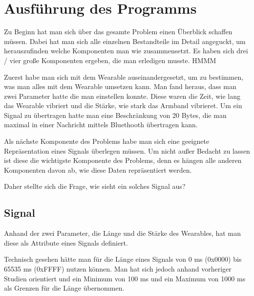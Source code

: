 
\section{Ausf{\"u}hrung des Programms}
\label{ch:Entwurf:sec:Ausf{\"u}hrung des Programms}

Zu Beginn hat man sich {\"u}ber das gesamte Problem einen {\"U}berblick schaffen m{\"u}ssen.
Dabei hat man sich alle einzelnen Bestandteile im Detail angeguckt, um herauszufinden welche Komponenten man wie zusammensetzt. 
Es haben sich drei / vier gro{\ss}e Komponenten ergeben, die man erledigen musste. HMMM 

Zuerst habe man sich mit dem Wearable auseinandergesetzt, um zu bestimmen, was man alles mit dem Wearable umsetzen kann.
Man fand heraus, dass man zwei Parameter hatte die man einstellen konnte. Diese waren die Zeit, wie lang das Wearable vibriert und die St{\"a}rke, wie stark das Armband vibrieret.
Um ein Signal zu {\"u}bertragen hatte man eine Beschr{\"a}nkung von 20 Bytes, die man maximal in einer Nachricht mittels Bluethooth {\"u}bertragen kann.

Als n{\"a}chste Komponente des Problems habe man sich eine geeignete Repr{\"a}sentation eines Signals {\"u}berlegen m{\"u}ssen. Um nicht au{\ss}er Bedacht zu lassen ist diese die wichtigste Komponente des Problems, denn es h{\"a}ngen alle anderen Komponenten davon ab, wie diese Daten repr{\"a}sentiert werden. 

Daher stellte sich die Frage, wie sieht ein solches Signal aus?

\subsection{Signal}

Anhand der zwei Parameter, die L{\"a}nge und die St{\"a}rke des Wearables, hat man diese als Attribute eines Signals definiert.  

Technisch gesehen h{\"a}tte man f{\"u}r die L{\"a}nge eines Signals von 0 ms (0x0000) bis 65535 ms (0xFFFF) nutzen k{\"o}nnen. 
Man hat sich jedoch anhand vorheriger Studien \cite{pescara2016ruttelflug} orientiert und ein Minimum von 100 ms und ein Maximum von 1000 ms als Grenzen f{\"u}r die L{\"a}nge {\"u}bernommen.


